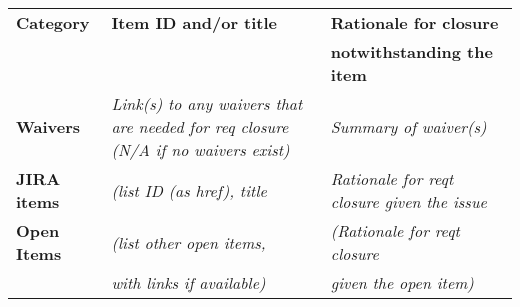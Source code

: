 \documentclass[TR]{spherex}
\begin{document}
\begin{small}
\begin{longtable}{|l|p{}|p{}|}
\hline
\textbf{Category} & \textbf{Item ID and/or title} & \textbf{Rationale for closure} \\
 & & \textbf{notwithstanding the item} \\ \hline\hline
\endhead
\textbf{Waivers} & \textit{Link(s) to any waivers that are needed for req closure (N/A if no waivers exist)} & \textit{Summary of waiver(s)} \\
\hline
\textbf{JIRA items} & \textit{(list ID (as href), title} & \textit{Rationale for reqt closure given the issue} \\
\hline
\textbf{Open Items} & \textit{(list other open items,} & \textit{(Rationale for reqt closure} \\
 & \textit{with links if available)} & \textit{given the open item)} \\
\hline
\end{longtable}


% 

\end{small}
\end{document}

